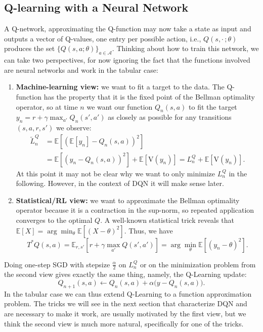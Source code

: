 \documentclass[11pt,a4paper]{article}
\newcommand{\E}{\mathbb{E}}
\begin{document}
\subsection{Q-learning with a Neural Network}
A Q-network, approximating the Q-function may now take a state as input and outputs a vector of Q-values,
one entry per possible action, i.e., $Q(s,\cdot\,;\theta)$ produces the set
$\{Q(s,a;\theta)\}_{a\in\mathcal A}$. Thinking about how to train this network, we can take two perspectives, for now ignoring the fact
that the functions involved are neural networks and work in the tabular case:
\begin{enumerate}
 \item \textbf{Machine-learning view:} we want to fit a target to the data.
 The Q-function has the property that it is the fixed point of the Bellman optimality operator,
 so at time $n$ we want our function $Q_n(s,a)$ to fit the target $y_n=r+\gamma\max_{a'}Q_n(s',a')$
 as closely as possible for any transitions $(s,a,r,s')$ we observe:
 \begin{equation}\label{eq:original-variance}
 \begin{aligned}
 \widetilde L_n^Q
 &=\E[(\E[y_n]-Q_n(s,a))^2]\\
 &=\E[(y_n-Q_n(s,a))^2]+\E[\mathrm V(y_n)]
 =L_n^Q+\E[\mathrm V(y_n)].
 \end{aligned}
 \end{equation}
 At this point it may not be clear why we want to only minimize $L_n^Q$ in the
 following. However, in the context of DQN it will make sense later.
 \item \textbf{Statistical/RL view:} we want to approximate the Bellman
 optimality operator
 because it is a contraction in the sup-norm, so repeated application converges
 to the optimal $Q$. A well-known statistical trick reveals that
 $\E[X]=\arg\min_\theta\E[(X-\theta)^2]$. Thus, we have
 \begin{equation}
 T^*Q(s,a)=\E_{r,s'}\!\left[r+\gamma\max_{a'}Q(s',a')\right]
 =\arg\min_\theta\E[(y_n-\theta)^2].
 \end{equation}
\end{enumerate}
Doing one-step SGD with stepsize $\frac{\alpha}{2}$ on $L_n^Q$ or on the
minimization problem from the second view gives exactly the same thing,
namely, the Q-Learning update:
\begin{equation}
 Q_{n+1}(s,a)\leftarrow Q_n(s,a)+\alpha\bigl(y-Q_n(s,a)\bigr).
\end{equation}
In the tabular case we can thus extend Q-Learning to a function approximation
problem. The tricks we will see in the next section that characterize DQN and are necessary
to make it work, are usually motivated by the first view, but we think the second 
view is much more natural, specifically for one of the tricks.
\end{document}
